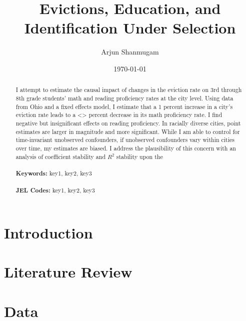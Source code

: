 \documentclass[12pt]{article}
\begin{document}
\begin{titlepage}
\title{Evictions, Education, and Identification Under Selection}
\author{Arjun Shanmugam}
\date{\today}
\maketitle
\begin{abstract}
\noindent I attempt to estimate the causal impact of changes in the eviction rate on 3rd through 8th grade students' math and reading proficiency rates at the city level. Using data from Ohio and a fixed effects model, I estimate that a 1 percent increase in a city's eviction rate leads to a <> percent decrease in its math proficiency rate. I find negative but insignificant effects on reading proficiency. In racially diverse cities, point estimates are larger in magnitude and more significant. While I am able to control for time-invariant unobserved confounders, if unobserved confounders vary within cities over time, my estimates are biased. I address the plausibility of this concern with an analysis of coefficient stability and $R^2$ stability upon the \\
\vspace{0in}\\
\noindent\textbf{Keywords:} key1, key2, key3\\
\vspace{0in}\\
\noindent\textbf{JEL Codes:} key1, key2, key3\\

\bigskip
\end{abstract}
\setcounter{page}{0}
\thispagestyle{empty}
\end{titlepage}
\pagebreak \newpage




\doublespacing


\section{Introduction} \label{sec:introduction}

\section{Literature Review} \label{sec:literature}

\section{Data} \label{sec:data}
\end{document}
